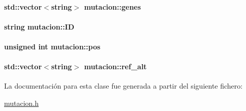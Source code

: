 \hypertarget{classmutacion_af0048945b6062d6eb88b91db707993f6}{
\paragraph[{genes}]{\setlength{\rightskip}{0pt plus 5cm}std\-::vector$<$string$>$ mutacion\-::genes\hspace{0.3cm}{\ttfamily [private]}}}\label{classmutacion_af0048945b6062d6eb88b91db707993f6}
\hypertarget{classmutacion_aafc39218473e0f21eb0c3dc05dd4f35e}{
\paragraph[{I\-D}]{\setlength{\rightskip}{0pt plus 5cm}string mutacion\-::\-I\-D\hspace{0.3cm}{\ttfamily [private]}}}\label{classmutacion_aafc39218473e0f21eb0c3dc05dd4f35e}
\hypertarget{classmutacion_ae1487b8648d0eaad68de5e4e5a87f3ff}{
\paragraph[{pos}]{\setlength{\rightskip}{0pt plus 5cm}unsigned int mutacion\-::pos\hspace{0.3cm}{\ttfamily [private]}}}\label{classmutacion_ae1487b8648d0eaad68de5e4e5a87f3ff}
\hypertarget{classmutacion_a2b3d0ed7547618562fae965d373b39e3}{
\paragraph[{ref\-\_\-alt}]{\setlength{\rightskip}{0pt plus 5cm}std\-::vector$<$string$>$ mutacion\-::ref\-\_\-alt\hspace{0.3cm}{\ttfamily [private]}}}\label{classmutacion_a2b3d0ed7547618562fae965d373b39e3}


La documentación para esta clase fue generada a partir del siguiente fichero\-:\begin{DoxyCompactItemize}
\item 
\hyperlink{mutacion_8h}{mutacion.\-h}\end{DoxyCompactItemize}
